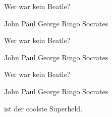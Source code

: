\documentclass[12pt,ngerman,answers]{exam}
\begin{document}
\begin{questions}

\question Wer war kein Beatle?

\begin{choices}
\choice John
\choice Paul
\choice George
\choice Ringo
\CorrectChoice Socrates
\end{choices}

\question Wer war kein Beatle?

\begin{checkboxes}
\choice John
\choice Paul
\choice George
\choice Ringo
\CorrectChoice Socrates
\end{checkboxes}

\question Wer war kein Beatle?

\begin{oneparcheckboxes}
\choice John
\choice Paul
\choice George
\choice Ringo
\CorrectChoice Socrates
\end{oneparcheckboxes}

\question {} ist der coolste Superheld.


\end{questions}
\end{document}
